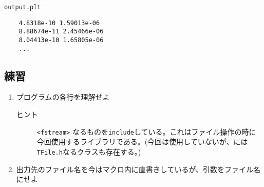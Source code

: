  \begin{itembox}{\texttt{output.plt}}
\begin{verbatim}
	4.8318e-10 1.59013e-06 
	8.88674e-11 2.45466e-06 
	8.04413e-10 1.65805e-06 
	...
\end{verbatim}
 \end{itembox}

  \subsection{練習}
  \begin{enumerate}
   \item プログラムの各行を理解せよ
	 \begin{description}
	  \item[ヒント] \verb|<fstream>| なるものを\verb|include|している。これはファイル操作の時に今回使用するライブラリである。(今回は使用していないが、\ROOT には\verb|TFile.h|なるクラスも存在する。)
	 \end{description}


\item 出力先のファイル名を今はマクロ内に直書きしているが、引数をファイル名にせよ
  \end{enumerate}

